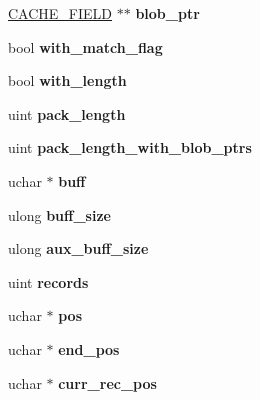 \begin{DoxyCompactItemize}
\mbox{\hyperlink{structst__cache__field}{C\+A\+C\+H\+E\+\_\+\+F\+I\+E\+LD}} $\ast$$\ast$ {\bfseries blob\+\_\+ptr}
\item 
\mbox{\label{classJOIN__CACHE_ab228f8d118ea32bd167cc92c116796c3}} 
bool {\bfseries with\+\_\+match\+\_\+flag}
\item 
\mbox{\label{classJOIN__CACHE_a619b64d802cb98507ce7dcadf69b4b39}} 
bool {\bfseries with\+\_\+length}
\item 
\mbox{\label{classJOIN__CACHE_aabb20dfc5c823491753c2bf42edab99b}} 
uint {\bfseries pack\+\_\+length}
\item 
\mbox{\label{classJOIN__CACHE_ac9cbbea9951d0cfbb5c58d5320cdf11e}} 
uint {\bfseries pack\+\_\+length\+\_\+with\+\_\+blob\+\_\+ptrs}
\item 
\mbox{\label{classJOIN__CACHE_abe63ca2c1b8d13537ce99c6ade8462c2}} 
uchar $\ast$ {\bfseries buff}
\item 
\mbox{\label{classJOIN__CACHE_a562dcbe2b1338bd7c717ee4ad069c5b3}} 
ulong {\bfseries buff\+\_\+size}
\item 
\mbox{\label{classJOIN__CACHE_ab967e760ff901e84b101e42ec592780b}} 
ulong {\bfseries aux\+\_\+buff\+\_\+size}
\item 
\mbox{\label{classJOIN__CACHE_ac58b89be952436db36e10ecec8f228ce}} 
uint {\bfseries records}
\item 
\mbox{\label{classJOIN__CACHE_aa60d2625f93538098b706b653b9bbc77}} 
uchar $\ast$ {\bfseries pos}
\item 
\mbox{\label{classJOIN__CACHE_a91106760bd45782ff001d53376342c98}} 
uchar $\ast$ {\bfseries end\+\_\+pos}
\item 
\mbox{\label{classJOIN__CACHE_a09897e9c52653094268047511afef739}} 
uchar $\ast$ {\bfseries curr\+\_\+rec\+\_\+pos}
\item 
\mbox{\label{classJOIN__CACHE_a3f3c2b4f8874c4adab87d7cf097b3d69}} 
$$
\end{DoxyCompactItemize}
